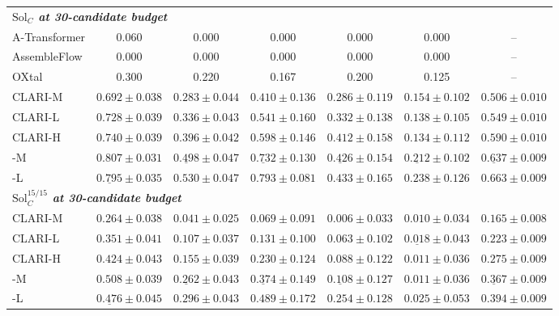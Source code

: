 \begin{table}[H]
\begin{tabular}{lcccccc}
\midrule
\multicolumn{7}{l}{\textbf{\emph{$\mathrm{Sol}_C$ at 30-candidate budget}}} \\
\addlinespace
A-Transformer & 0.060 & 0.000 & 0.000 & 0.000 & 0.000 & -- \\
AssembleFlow & 0.000 & 0.000 & 0.000 & 0.000 & 0.000 & -- \\
OXtal & 0.300 & 0.220 & 0.167 & 0.200 & 0.125 & -- \\
CLARI-M & $0.692 \pm 0.038$ & $0.283 \pm 0.044$ & $0.410 \pm 0.136$ & $0.286 \pm 0.119$ & $0.154 \pm 0.102$ & $0.506 \pm 0.010$ \\
CLARI-L & $0.728 \pm 0.039$ & $0.336 \pm 0.043$ & $0.541 \pm 0.160$ & $0.332 \pm 0.138$ & $0.138 \pm 0.105$ & $0.549 \pm 0.010$ \\
CLARI-H & $0.740 \pm 0.039$ & $0.396 \pm 0.042$ & $0.598 \pm 0.146$ & $0.412 \pm 0.158$ & $0.134 \pm 0.112$ & $0.590 \pm 0.010$ \\
\rowcolor{mfTealFill}
\model{}-M & $\mathbf{0.807} \pm 0.031$ & $\underline{0.498} \pm 0.047$ & $\underline{0.732} \pm 0.130$ & $\underline{0.426} \pm 0.154$ & $\underline{0.212} \pm 0.102$ & $\underline{0.637} \pm 0.009$ \\
\rowcolor{mfTealFill}
\model{}-L & $\underline{0.795} \pm 0.035$ & $\mathbf{0.530} \pm 0.047$ & $\mathbf{0.793} \pm 0.081$ & $\mathbf{0.433} \pm 0.165$ & $\mathbf{0.238} \pm 0.126$ & $\mathbf{0.663} \pm 0.009$ \\
\midrule
\multicolumn{7}{l}{\textbf{\emph{$\mathrm{Sol}_C^{15/15}$ at 30-candidate budget}}} \\
\addlinespace
CLARI-M & $0.264 \pm 0.038$ & $0.041 \pm 0.025$ & $0.069 \pm 0.091$ & $0.006 \pm 0.033$ & $0.010 \pm 0.034$ & $0.165 \pm 0.008$ \\
CLARI-L & $0.351 \pm 0.041$ & $0.107 \pm 0.037$ & $0.131 \pm 0.100$ & $0.063 \pm 0.102$ & $\underline{0.018} \pm 0.043$ & $0.223 \pm 0.009$ \\
CLARI-H & $0.424 \pm 0.043$ & $0.155 \pm 0.039$ & $0.230 \pm 0.124$ & $0.088 \pm 0.122$ & $0.011 \pm 0.036$ & $0.275 \pm 0.009$ \\
\rowcolor{mfTealFill}
\model{}-M & $\mathbf{0.508} \pm 0.039$ & $\underline{0.262} \pm 0.043$ & $\underline{0.374} \pm 0.149$ & $\underline{0.108} \pm 0.127$ & $0.011 \pm 0.036$ & $\underline{0.367} \pm 0.009$ \\
\rowcolor{mfTealFill}
\model{}-L & $\underline{0.476} \pm 0.045$ & $\mathbf{0.296} \pm 0.043$ & $\mathbf{0.489} \pm 0.172$ & $\mathbf{0.254} \pm 0.128$ & $\mathbf{0.025} \pm 0.053$ & $\mathbf{0.394} \pm 0.009$ \\

\end{tabular}
\end{table}
